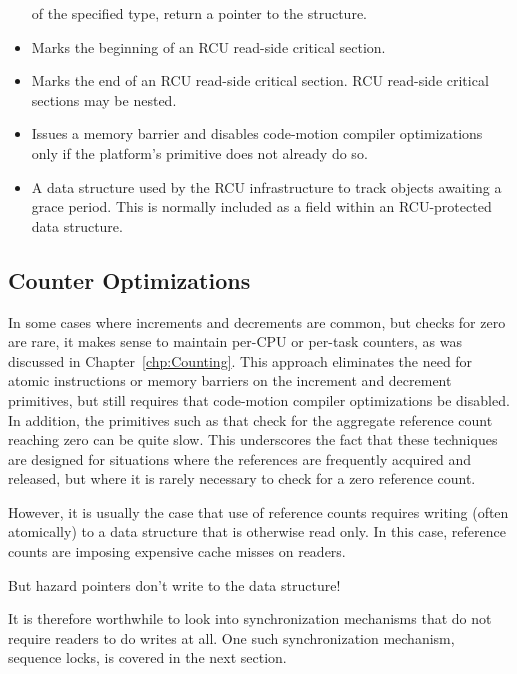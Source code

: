 \begin{itemize}
	of the specified type, return a pointer to the structure.
\item	{}
	Marks the beginning of an RCU read-side critical section.
\item	{}
	Marks the end of an RCU read-side critical section.
	RCU read-side critical sections may be nested.
\item	{}
	Issues a memory barrier and disables code-motion compiler
	optimizations only if the platform's 
	primitive does not already do so.
\item	{}
	A data structure used by the RCU infrastructure to track
	objects awaiting a grace period.
	This is normally included as a field within an RCU-protected
	data structure.
\end{itemize}

\subsection{Counter Optimizations}
\label{sec:defer:Counter Optimizations}

In some cases where increments and decrements are common, but checks
for zero are rare, it makes sense to maintain per-CPU or per-task
counters, as was discussed in Chapter~\ref{chp:Counting}.
This approach eliminates the need for atomic instructions or memory
barriers on the increment and decrement primitives, but still requires
that code-motion compiler optimizations be disabled.
In addition, the primitives such as 
that check for the aggregate reference
count reaching zero can be quite slow.
This underscores the fact that these techniques are designed
for situations where the references are frequently acquired and
released, but where it is rarely necessary to check for a zero
reference count.


However, it is usually the case that use of reference counts requires
writing (often atomically) to a data structure that is otherwise
read only.
In this case, reference counts are imposing expensive cache misses
on readers.

\QuickQuiz{}
	But hazard pointers don't write to the data structure!
 \QuickQuizEnd

It is therefore worthwhile to look into synchronization mechanisms
that do not require readers to do writes at all.
One such synchronization mechanism, sequence locks, is covered in
the next section.
